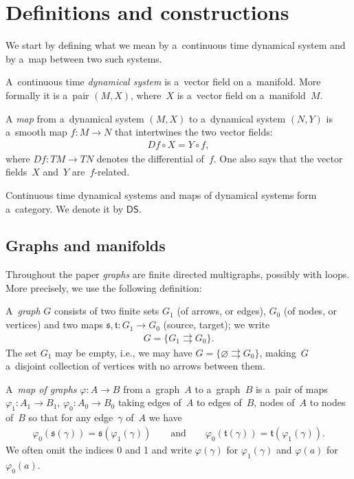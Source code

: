 \documentclass[pdftex]{sigma}
\numberwithin{equation}{section}
\begin{document}
\section{Definitions and constructions}

\noindent We start by def\/ining what we mean by a~continuous time dynamical system and by a~map between two such systems.
\begin{Definition}
\label{def:dyn-sys}
A~continuous time {\it dynamical system} is a~vector f\/ield on a~manifold.
More formally it is a~pair $(M,X)$, where~$X$ is a~vector f\/ield on a~manifold~$M$.

A {\it map} from a~dynamical system $(M,X)$ to a~dynamical system $(N, Y)$ is a~smooth map $f:M\to N$ that intertwines
the two vector f\/ields:
\begin{gather*}
Df\circ X = Y\circ f,
\end{gather*}
where $Df:TM\to TN$ denotes the dif\/ferential of~$f$.
One also says that the vector f\/ields~$X$ and~$Y$ are~$f$-related.
\end{Definition}

\begin{Notation}
\label{rmrk:dyn-sys}
Continuous time dynamical systems and maps of dynamical systems form a~category.
We denote it by $\mathsf{DS}$.
\end{Notation}

\subsection{Graphs and manifolds}

Throughout the paper {\em graphs} are f\/inite directed multigraphs, possibly with loops.
More precisely, we use the following def\/inition:
\begin{Definition}%
A~{\it graph} $ G$ consists of two f\/inite sets $G_1$ (of arrows, or edges), $G_0$ (of nodes, or vertices) and two maps
$\mathfrak s,\mathfrak t\colon G_1 \to G_0$ (source, target); we write
\begin{gather*}
G = \{G_1\rightrightarrows G_0\}.
\end{gather*}
The set $G_1$ may be empty, i.e., we may have $G= \{\varnothing \rightrightarrows G_0\}$, making~$G$ a~disjoint
collection of vertices with no arrows between them.
\end{Definition}

\begin{Definition}
A~{\it map of graphs} $\varphi\colon A\to B$ from a~graph~$A$ to a~graph~$B$ is a~pair of maps $\varphi_1\colon A_1\to
B_1$, $\varphi_0\colon A_0\to B_0$ taking edges of~$A$ to edges of~$B$, nodes of~$A$ to nodes of~$B$ so that for any
edge~$\gamma$ of~$A$ we have
\begin{gather*}
\varphi_0 (\mathfrak s(\gamma)) = \mathfrak s(\varphi_1 (\gamma))
\qquad
\text{and}
\qquad
\varphi_0 (\mathfrak t(\gamma)) = \mathfrak t(\varphi_1 (\gamma)).
\end{gather*}
We often omit the indices 0 and 1 and write $\varphi(\gamma)$ for $\varphi_1 (\gamma)$ and $\varphi(a)$ for $\varphi_0(a)$.
\end{Definition}
\end{document}
